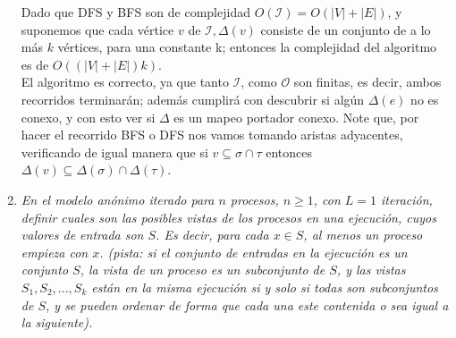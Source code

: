 \documentclass{article}
\begin{document}
\begin{enumerate}
{    Dado que DFS y BFS son de complejidad $O(\mathcal{I}) = O(|V| + |E|)$, y suponemos que cada vértice $v$ de $\mathcal{I},\Delta(v)$
    consiste de un conjunto de a lo más $k$ vértices, para una constante k; entonces la complejidad del algoritmo es de
    $O((|V| + |E|) k)$.\\
    El algoritmo es correcto, ya que tanto $\mathcal{I}$, como $\mathcal{O}$ son finitas, es decir, ambos recorridos terminarán; además
    cumplirá con descubrir si algún $\Delta(e)$ no es conexo, y con esto ver si $\Delta$ es un mapeo portador conexo. Note que, por
    hacer el recorrido BFS o DFS nos vamos tomando aristas adyacentes, verificando de igual manera que si $v\subseteq\sigma\cap\tau$ entonces
    $\Delta(v)\subseteq\Delta(\sigma)\cap\Delta(\tau)$.
  }

\item {
    \textsl{
      En el modelo anónimo iterado para $n$ procesos, $n ≥ 1$, con $L = 1$ iteración, definir
      cuales son las posibles vistas de los procesos en una ejecución, cuyos valores de entrada
      son $S$. Es decir, para cada $x \in S$, al menos un proceso empieza con $x$. (pista: si el
      conjunto de entradas en la ejecución es un conjunto $S$, la vista de un proceso es un 
      subconjunto de $S$, y las vistas $S_1,S_2,...,S_k$ están en la misma ejecución si y solo si
      todas son subconjuntos de $S$, y se pueden ordenar de forma que cada una este contenida o
      sea igual a la siguiente).
    }

}
\end{enumerate}
\end{document}
